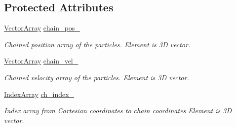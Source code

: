 \subsection*{Protected Attributes}
\begin{DoxyCompactItemize}
\item 
\mbox{\hyperlink{class_vel_indep_particles_a27580f65b6523bfb6900520af2e44708}{Vector\+Array}} \mbox{\hyperlink{class_vel_indep_chain_particles_a8e2defc6dcb9986dbc9c8c62215331aa}{chain\+\_\+pos\+\_\+}}
\begin{DoxyCompactList}\small\item\em Chained position array of the particles. Element is 3D vector. \end{DoxyCompactList}\item 
\mbox{\hyperlink{class_vel_indep_particles_a27580f65b6523bfb6900520af2e44708}{Vector\+Array}} \mbox{\hyperlink{class_vel_indep_chain_particles_a96ed0f2a5fcfb290dfafb42f08131e2f}{chain\+\_\+vel\+\_\+}}
\begin{DoxyCompactList}\small\item\em Chained velocity array of the particles. Element is 3D vector. \end{DoxyCompactList}\item 
\mbox{\hyperlink{class_vel_indep_chain_particles_a691749351fb710d16619ef6cc43bb1e6}{Index\+Array}} \mbox{\hyperlink{class_vel_indep_chain_particles_a8f10bc65c3e0de542db29178824522cb}{ch\+\_\+index\+\_\+}}
\begin{DoxyCompactList}\small\item\em Index array from Cartesian coordinates to chain coordinates Element is 3D vector. \end{DoxyCompactList}\end{DoxyCompactItemize}
